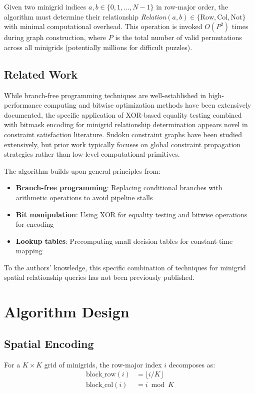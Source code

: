 \documentclass[11pt,a4paper]{article}
\begin{document}
Given two minigrid indices $a, b \in \{0, 1, \ldots, N-1\}$ in row-major order, the algorithm must determine their relationship \emph{Relation}$(a, b) \in \{\text{Row}, \text{Col}, \text{Not}\}$ with minimal computational overhead. This operation is invoked $O(P^2)$ times during graph construction, where $P$ is the total number of valid permutations across all minigrids (potentially millions for difficult puzzles).

\subsection{Related Work}

While branch-free programming techniques are well-established in high-performance computing and bitwise optimization methods have been extensively documented, the specific application of XOR-based equality testing combined with bitmask encoding for minigrid relationship determination appears novel in constraint satisfaction literature. Sudoku constraint graphs have been studied extensively, but prior work typically focuses on global constraint propagation strategies rather than low-level computational primitives.

The algorithm builds upon general principles from:
\begin{itemize}
    \item \textbf{Branch-free programming}: Replacing conditional branches with arithmetic operations to avoid pipeline stalls
    \item \textbf{Bit manipulation}: Using XOR for equality testing and bitwise operations for encoding
    \item \textbf{Lookup tables}: Precomputing small decision tables for constant-time mapping
\end{itemize}

To the authors' knowledge, this specific combination of techniques for minigrid spatial relationship queries has not been previously published.

\section{Algorithm Design}

\subsection{Spatial Encoding}

For a $K \times K$ grid of minigrids, the row-major index $i$ decomposes as:
\begin{align}
    \text{block\_row}(i) &= \lfloor i / K \rfloor \\
    \text{block\_col}(i) &= i \bmod K
\end{align}
\end{document}
